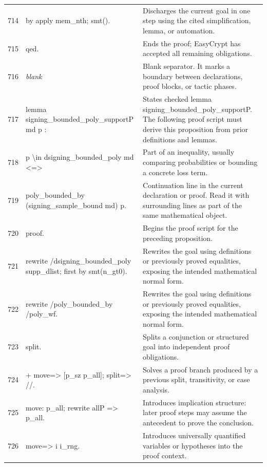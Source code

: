 \documentclass[10pt]{article}
\begin{document}
\begin{longtable}{r L{0.53\textwidth} L{0.37\textwidth}}
714 & {\ttfamily\scriptsize by apply mem\_nth; smt().} & Discharges the current goal in one step using the cited simplification, lemma, or automation. \\
715 & {\ttfamily\scriptsize qed.} & Ends the proof; EasyCrypt has accepted all remaining obligations. \\
716 & {\ttfamily\scriptsize \emph{blank}} & Blank separator.  It marks a boundary between declarations, proof blocks, or tactic phases. \\
717 & {\ttfamily\scriptsize lemma signing\_bounded\_poly\_supportP md p :} & States checked lemma signing\_bounded\_poly\_supportP.  The following proof script must derive this proposition from prior definitions and lemmas. \\
718 & {\ttfamily\scriptsize   p \textbackslash{}in dsigning\_bounded\_poly md <=>} & Part of an inequality, usually comparing probabilities or bounding a concrete loss term. \\
719 & {\ttfamily\scriptsize   poly\_bounded\_by (signing\_sample\_bound md) p.} & Continuation line in the current declaration or proof.  Read it with surrounding lines as part of the same mathematical object. \\
720 & {\ttfamily\scriptsize proof.} & Begins the proof script for the preceding proposition. \\
721 & {\ttfamily\scriptsize rewrite /dsigning\_bounded\_poly supp\_dlist; first by smt(n\_gt0).} & Rewrites the goal using definitions or previously proved equalities, exposing the intended mathematical normal form. \\
722 & {\ttfamily\scriptsize rewrite /poly\_bounded\_by /poly\_wf.} & Rewrites the goal using definitions or previously proved equalities, exposing the intended mathematical normal form. \\
723 & {\ttfamily\scriptsize split.} & Splits a conjunction or structured goal into independent proof obligations. \\
724 & {\ttfamily\scriptsize + move=> [p\_sz p\_all]; split=> //.} & Solves a proof branch produced by a previous split, transitivity, or case analysis. \\
725 & {\ttfamily\scriptsize   move: p\_all; rewrite allP => p\_all.} & Introduces implication structure: later proof steps may assume the antecedent to prove the conclusion. \\
726 & {\ttfamily\scriptsize   move=> i i\_rng.} & Introduces universally quantified variables or hypotheses into the proof context. \\

\end{longtable}
\end{document}
